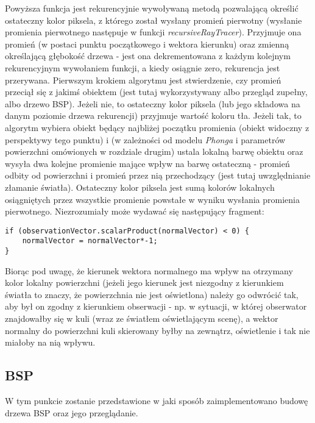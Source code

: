 Powyższa funkcja jest rekurencyjnie wywoływaną metodą pozwalającą określić ostateczny kolor piksela, z którego został wysłany promień pierwotny (wysłanie promienia pierwotnego następuje w funkcji \emph{recursiveRayTracer}). Przyjmuje ona promień (w postaci punktu początkowego i wektora kierunku) oraz zmienną określającą głębokość drzewa - jest ona dekrementowana z każdym kolejnym rekurencyjnym wywołaniem funkcji, a kiedy osiągnie zero, rekurencja jest przerywana. Pierwszym krokiem algorytmu jest stwierdzenie, czy promień przeciął się z jakimś obiektem (jest tutaj wykorzystywany albo przegląd zupełny, albo drzewo BSP). Jeżeli nie, to ostateczny kolor piksela (lub jego składowa na danym poziomie drzewa rekurencji) przyjmuje wartość koloru tła. Jeżeli tak, to algorytm wybiera obiekt będący najbliżej początku promienia (obiekt widoczny z perspektywy tego punktu) i (w zależności od modelu \emph{Phonga} i parametrów powierzchni omówionych w rozdziale drugim) ustala lokalną barwę obiektu oraz wysyła dwa kolejne promienie mające wpływ na barwę ostateczną - promień odbity od powierzchni i promień przez nią przechodzący (jest tutaj uwzględnianie złamanie światła).
Ostateczny kolor piksela jest sumą kolorów lokalnych osiągniętych przez wszystkie promienie powstałe w wyniku wysłania promienia pierwotnego.	Niezrozumiały może wydawać się następujący fragment:

\begin{lstlisting}[caption={}]
if (observationVector.scalarProduct(normalVector) < 0) {
    normalVector = normalVector*-1;
}
\end{lstlisting}

Biorąc pod uwagę, że kierunek wektora normalnego ma wpływ na otrzymany kolor lokalny powierzchni (jeżeli jego kierunek jest niezgodny z kierunkiem światła to znaczy, że powierzchnia nie jest oświetlona) należy go odwrócić tak, aby był on zgodny z kierunkiem obserwacji - np. w sytuacji, w której obserwator znajdowałby się w kuli (wraz ze światłem oświetlającym scenę), a wektor normalny do powierzchni kuli skierowany byłby na zewnątrz, oświetlenie i tak nie miałoby na nią wpływu.

\subsection{BSP}

W tym punkcie zostanie przedstawione w jaki sposób zaimplementowano budowę drzewa BSP oraz jego przeglądanie.


